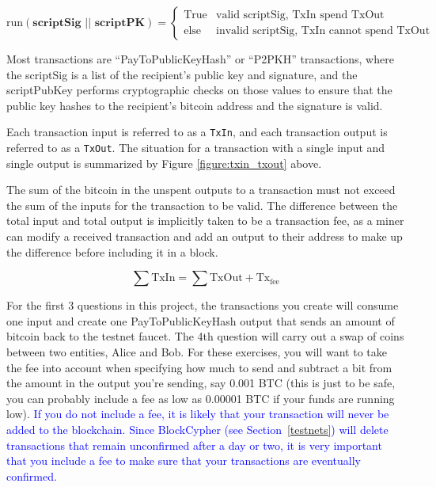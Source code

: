 \documentclass[11pt]{article}
\begin{document}
\[
  \text{run}(\textbf{scriptSig } || \textbf{ scriptPK}) =
  \begin{cases}
      \text{True} & \text{valid scriptSig, TxIn spend TxOut} \\
      \text{else} & \text{invalid scriptSig, TxIn cannot spend TxOut}
   \end{cases}
\]

\hspace{20pt} Most transactions are ``PayToPublicKeyHash'' or ``P2PKH'' transactions, where the scriptSig is a list of the recipient's public key and signature, and the scriptPubKey performs cryptographic checks on those values to ensure that the public key hashes to the recipient's bitcoin address and the signature is valid.

\hspace{20pt} Each transaction input is referred to as a \texttt{TxIn}, and each transaction output is referred to as a \texttt{TxOut}. The situation for a transaction with a single input and single output is summarized by Figure \ref{figure:txin_txout} above.

\hspace{20pt}The sum of the bitcoin in the unspent outputs to a transaction must not exceed the sum of the inputs for the transaction to be valid. The difference between the total input and total output is implicitly taken to be a transaction fee, as a miner can modify a received transaction and add an output to their address to make up the difference before including it in a block.

\[\sum \text{TxIn} = \sum \text{TxOut} + \text{Tx}_{\text{fee}}\]

\hspace{20pt}For the first 3 questions in this project, the transactions you create will consume one input and create one PayToPublicKeyHash output that sends an amount of bitcoin back to the testnet faucet. The 4th question will carry out a swap of coins between two entities, Alice and Bob. For these exercises, you will want to take the fee into account when specifying how much to send and subtract a bit from the amount in the output you're sending, say 0.001 BTC (this is just to be safe, you can probably include a fee as low as 0.00001 BTC if your funds are running low). \textcolor{blue}{If you do not include a fee, it is likely that your transaction will never be added to the blockchain. Since BlockCypher (see Section~\ref{testnets}) will delete transactions that remain unconfirmed after a day or two, it is very important that you include a fee to make sure that your transactions are eventually confirmed.}
\end{document}
